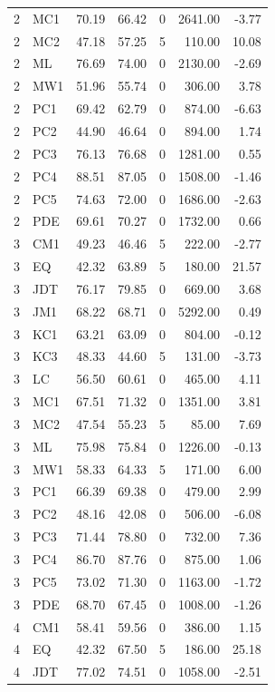 \begin{table}
\begin{tabular}{rlrrrrr}
2 & MC1 & 70.19 & 66.42 & 0 & 2641.00 & -3.77 \\
2 & MC2 & 47.18 & 57.25 & 5 & 110.00 & 10.08 \\
2 & ML & 76.69 & 74.00 & 0 & 2130.00 & -2.69 \\
2 & MW1 & 51.96 & 55.74 & 0 & 306.00 & 3.78 \\
2 & PC1 & 69.42 & 62.79 & 0 & 874.00 & -6.63 \\
2 & PC2 & 44.90 & 46.64 & 0 & 894.00 & 1.74 \\
2 & PC3 & 76.13 & 76.68 & 0 & 1281.00 & 0.55 \\
2 & PC4 & 88.51 & 87.05 & 0 & 1508.00 & -1.46 \\
2 & PC5 & 74.63 & 72.00 & 0 & 1686.00 & -2.63 \\
2 & PDE & 69.61 & 70.27 & 0 & 1732.00 & 0.66 \\
3 & CM1 & 49.23 & 46.46 & 5 & 222.00 & -2.77 \\
3 & EQ & 42.32 & 63.89 & 5 & 180.00 & 21.57 \\
3 & JDT & 76.17 & 79.85 & 0 & 669.00 & 3.68 \\
3 & JM1 & 68.22 & 68.71 & 0 & 5292.00 & 0.49 \\
3 & KC1 & 63.21 & 63.09 & 0 & 804.00 & -0.12 \\
3 & KC3 & 48.33 & 44.60 & 5 & 131.00 & -3.73 \\
3 & LC & 56.50 & 60.61 & 0 & 465.00 & 4.11 \\
3 & MC1 & 67.51 & 71.32 & 0 & 1351.00 & 3.81 \\
3 & MC2 & 47.54 & 55.23 & 5 & 85.00 & 7.69 \\
3 & ML & 75.98 & 75.84 & 0 & 1226.00 & -0.13 \\
3 & MW1 & 58.33 & 64.33 & 5 & 171.00 & 6.00 \\
3 & PC1 & 66.39 & 69.38 & 0 & 479.00 & 2.99 \\
3 & PC2 & 48.16 & 42.08 & 0 & 506.00 & -6.08 \\
3 & PC3 & 71.44 & 78.80 & 0 & 732.00 & 7.36 \\
3 & PC4 & 86.70 & 87.76 & 0 & 875.00 & 1.06 \\
3 & PC5 & 73.02 & 71.30 & 0 & 1163.00 & -1.72 \\
3 & PDE & 68.70 & 67.45 & 0 & 1008.00 & -1.26 \\
4 & CM1 & 58.41 & 59.56 & 0 & 386.00 & 1.15 \\
4 & EQ & 42.32 & 67.50 & 5 & 186.00 & 25.18 \\
4 & JDT & 77.02 & 74.51 & 0 & 1058.00 & -2.51 \\

\end{tabular}
\end{table}
